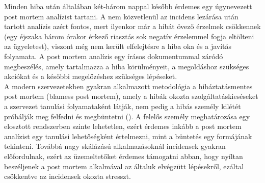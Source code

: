 Minden hiba után általában két-három nappal később érdemes egy úgynevezett post mortem analízist tartani. A nem közvetlenül az incidens lezárása után tartott analízis azért fontos, mert ilyenkor már a hibát övező érzelmek csökkennek (egy éjszaka három órakor érkező riasztás sok negatív érzelemmel fogja eltölteni az ügyeletest), viszont még nem került elfelejtésre a hiba oka és a javítás folyamata. A post mortem analízis egy írásos dokumentummal záródó megbeszélés, amely tartalmazza a hiba körülményeit, a megoldáshoz szükséges akciókat és a későbbi megelőzéshez szükséges lépéseket.\hfill\\
A modern szervezetekben gyakran alkalmazott metodológia a hibáztatásmentes post mortem (blamess post mortem), amely a hibák okozta szolgáltatáskieséseket a szervezet tanulási folyamataként látják, nem pedig a hibás személy kilétét próbálják meg felfedni és megbüntetni (\cite{blameless_post_mortem}).
A felelős személy meghatározása egy elosztott rendszerben szinte lehetetlen, ezért érdemes inkább a post mortem analízist egy tanulási lehetőségként értelmezni, mint a büntetés egy formájának tekinteni. Továbbá nagy skálázású alkalmazásoknál incidensek gyakran előfordulnak, ezért az üzemeltetőket érdemes támogatni abban, hogy nyíltan beszéljenek a post mortem alkalmával az általuk elvégzütt lépésekről, ezáltal csökkentve az incidensek okozta stresszt.